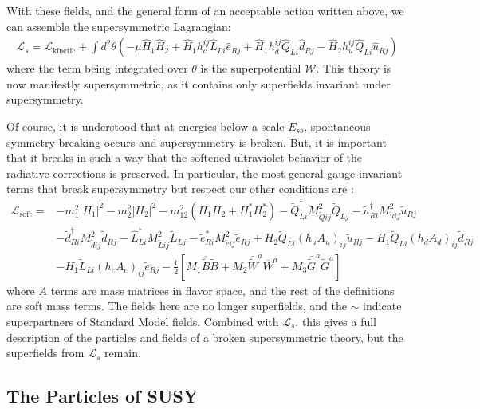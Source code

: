 With these fields, and the general form of an acceptable action written above, we can assemble the supersymmetric Lagrangian:
\begin{align}
  \mathcal{L}_s = \mathcal{L}_\mathrm{kinetic} + \int d^2\theta \left( -\mu \hat{H}_1 \hat{H}_2 + \hat{H}_1 h_c^{ij}\hat{L}_{Li} \hat{e}_{Rj} + \hat{H}_1 h^{ij}_d \hat{Q}_{Li} \hat{d}_{Rj} - \hat{H}_2 h^{ij}_u \hat{Q}_{Li} \hat{u}_{Rj} \right)
\end{align}
where the term being integrated over $\theta$ is the superpotential $\mathcal{W}$. This theory is now manifestly supersymmetric, as it contains only superfields invariant under supersymmetry. 

Of course, it is understood that at energies below a scale $E_{sb}$, spontaneous symmetry breaking occurs and supersymmetry is broken. But, it is important that it breaks in such a way that the softened ultraviolet behavior of the radiative corrections is preserved. In particular, the most general gauge-invariant terms that break supersymmetry but respect our other conditions are \cite{Jungman}:
\begin{align}
  \mathcal{L}_\mathrm{soft} = &-m_1^2 |H_1|^2 - m_2^2 |H_2|^2 - m_{12}^2 \left( H_1 H_2 + H_1^* H_2^* \right) - \tilde{Q}_{Li}^\dagger M_{\tilde{Q} ij}^2 \tilde{Q}_{Lj} - \tilde{u}^\dagger_{Ri} M^2_{\tilde{u} i j} \tilde{u}_{Rj}\nonumber\\
  &-\tilde{d}_{Ri}^\dagger M^2_{\tilde{d} i j} \tilde{d}_{Rj} -\hat{L}^\dagger_{Li} M^2_{\tilde{L} ij} \tilde{L}_{Lj} - \tilde{e}^*_{Ri} M^2_{\tilde{e} ij} \tilde{e}_{Rj} + H_2 \tilde{Q}_{Li}(h_u A_u)_{ij} \tilde{u}_{Rj} -H_1 \tilde{Q}_{Li} (h_d A_d)_{ij} \tilde{d}_{Rj}\nonumber\\
  &-H_1 \tilde{L}_{Li} (h_e A_e)_{ij} \tilde{e}_{Rj} - \frac{1}{2} \left[ M_1 \overline{\tilde{B}} \tilde{B} + M_2 \overline{\tilde{W}}^a \overline{W}^a + M_3 \overline{\tilde{G}}^a \tilde{G}^a \right]
\end{align}
where $A$ terms are mass matrices in flavor space, and the rest of the definitions are soft mass terms. The fields here are no longer superfields, and the $\sim$ indicate superpartners of Standard Model fields. Combined with $\mathcal{L}_s$, this gives a full description of the particles and fields of a broken supersymmetric theory, but the superfields from $\mathcal{L}_s$ remain.


\subsection{The Particles of SUSY}

